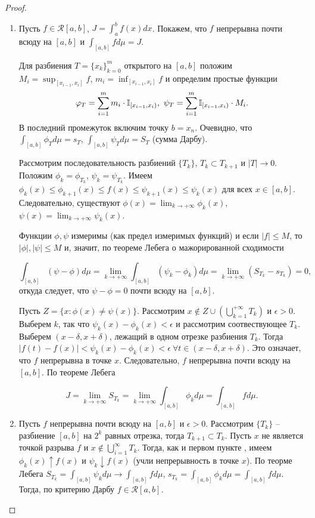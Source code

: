 \begin{proof}
    \begin{enumerate}
        \item Пусть $f \in \mathcal{R}[a, b]$, $ J= \int_{a}^{b}f(x) dx$. Покажем, что $f$ непрерывна почти всюду на $[a, b]$ и $\int_{[a, b]}f d\mu = J$.
        
        Для разбиения $T = \{x_{k}\}_{k = 0}^{m}$ открытого на $[a, b]$ положим $M_{i} = \sup_{[x_{i-1}, x_{i}]} f$, $m_{i} = \inf_{[x_{i-1}, x_{i}]}f$ и определим простые функции 
        \[\varphi_{T} = \sum_{i=1}^{m}m_{i}\cdot \mathbb{I}_{[x_{i-1}, x_{i})}, \ \psi_{T} = \sum_{i=1}^{m}\mathbb{I}_{[x_{i-1}, x_{i})} \cdot M_{i}.\]
        В последний промежуток включим точку $b = x_{n}$. Очевидно, что $\int_{[a, b]} \phi_{T} d\mu = s_{T}$, $\int_{[a, b]} \psi_{T} d\mu = S_{T}$ (сумма Дарбу). 
        
        Рассмотрим последовательность разбиений $\{T_{k}\}$, $T_{k} \subset T_{k+1}$ и $|T| \to 0$. Положим $\phi_{k} = \phi_{T_{k}}$, $\psi_{k} = \psi_{T_{k}}$. Имеем $\phi_{k}(x) \leq \phi_{k+1}(x) \leq f(x) \leq \psi_{k+1}(x) \leq \psi_{k}(x)$ для всех $x \in [a, b]$. Следовательно, существуют $\phi(x) = \lim_{k \to +\infty}\phi_{k}(x)$, $\psi(x) = \lim_{k \to +\infty}\psi_{k}(x)$.
        
        Функции $\phi, \psi$ измеримы (как предел измеримых функций) и если $|f| \leq M$, то $|\phi|, |\psi| \leq M$ и, значит, по теореме Лебега о мажорированной сходимости
        
        \[\int_{[a, b]}(\psi - \phi) d\mu = \lim_{k \to +\infty} \int_{[a, b]}(\psi_{k} - \phi_{k}) d\mu = \lim_{k \to +\infty}(S_{T_{k}} - s_{T_{k}}) = 0,\]
        откуда следует, что $\psi - \phi = 0$ почти всюду на $[a, b]$.
        
        Пусть $Z = \{x : \phi (x) \neq \psi (x) \}$. Рассмотрим $x \not\in Z \cup (\bigcup_{k=1}^{+\infty}T_{k})$ и $\epsilon > 0$. Выберем $k$, так что $\psi_{k}(x) - \phi_{k}(x) < \epsilon$ и рассмотрим соотвествующее $T_{k}$. Выберем $(x - \delta, x + \delta)$, лежащий в одном отрезке разбиения $T_{k}$. Тогда $|f(t)-f(x)| < \psi_{k}(x) - \phi_{k}(x) < \epsilon \ \forall t \in (x - \delta, x + \delta)$. Это означает, что $f$ непрерывна в точке $x$. Следовательно, $f$ непрерывна почти всюду на $[a, b]$. По теореме Лебега
        
        \[J = \lim_{k \to + \infty}S_{T_{k}} = \lim_{k \to + \infty} \int_{[a, b]}\phi_{k} d\mu = \int_{[a, b]}f d\mu.\]
        
        \item Пусть $f$ непрерывна почти всюду на $[a, b]$ и $\epsilon > 0$. Рассмотрим $\{T_{k}\}$ -- разбиение $[a, b]$ на $2^{k}$ равных отрезка, тогда $T_{k + 1} \subset T_{k}$. Пусть $x$ не является точкой разрыва $f$ и $x \not\in \bigcup_{i=1}^{\infty}{T_{k}}$. Тогда, как и первом пункте , имеем $\phi_{k}(x) \uparrow f(x)$ и $\psi_{k} \downarrow f(x)$ (учли непрерывность в точке $x$). По теорме Лебега $S_{T_{k}} = \int_{[a, b]}\psi_{k} d\mu \to \int_{[a, b]}f d\mu$, $s_{T_{k}} = \int_{[a, b]}\phi_{k} d\mu = \int_{[a, b]}f d\mu$. Тогда, по критерию Дарбу $f \in \mathcal{R}[a, b]$.
    \end{enumerate}
\end{proof}

